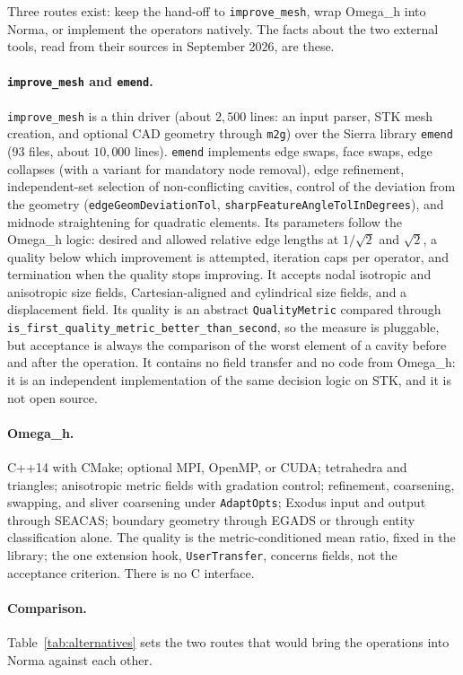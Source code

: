 \documentclass[11pt]{article}
\newcommand{\code}[1]{\texttt{#1}}
\newcommand{\omegah}{Omega\_h}
\begin{document}
Three routes exist: keep the hand-off to \code{improve\_mesh}, wrap
\omegah{} into Norma, or implement the operators natively. The facts
about the two external tools, read from their sources in September 2026,
are these.

\paragraph{\code{improve\_mesh} and \code{emend}.} \code{improve\_mesh}
is a thin driver (about $2{,}500$ lines: an input parser, STK mesh
creation, and optional CAD geometry through \code{m2g}) over the Sierra
library \code{emend} (93 files, about $10{,}000$ lines). \code{emend}
implements edge swaps, face swaps, edge collapses (with a variant for
mandatory node removal), edge refinement, independent-set selection of
non-conflicting cavities, control of the deviation from the geometry
(\code{edgeGeomDeviationTol}, \code{sharpFeatureAngleTolInDegrees}), and
midnode straightening for quadratic elements. Its parameters follow the
\omegah{} logic: desired and allowed relative edge lengths at $1/\sqrt2$
and $\sqrt2$, a quality below which improvement is attempted,
iteration caps per operator, and termination when the quality stops
improving. It accepts nodal isotropic and anisotropic size fields,
Cartesian-aligned and cylindrical size fields, and a displacement field.
Its quality is an abstract \code{QualityMetric} compared through
\code{is\_first\_quality\_metric\_better\_than\_second}, so the measure
is pluggable, but acceptance is always the comparison of the worst
element of a cavity before and after the operation. It contains no field
transfer and no code from \omegah{}: it is an independent implementation
of the same decision logic on STK, and it is not open source.

\paragraph{\omegah{}.} C++14 with CMake; optional MPI, OpenMP, or CUDA;
tetrahedra and triangles; anisotropic metric fields with gradation
control; refinement, coarsening, swapping, and sliver coarsening under
\code{AdaptOpts}; Exodus input and output through SEACAS; boundary
geometry through EGADS or through entity classification alone. The
quality is the metric-conditioned mean ratio, fixed in the library; the
one extension hook, \code{UserTransfer}, concerns fields, not the
acceptance criterion. There is no C interface.

\paragraph{Comparison.} Table~\ref{tab:alternatives} sets the two
routes that would bring the operations into Norma against each other.
\end{document}
